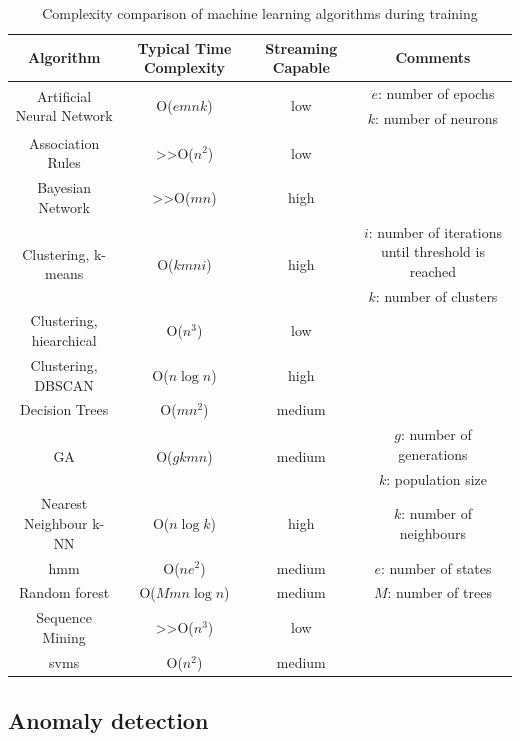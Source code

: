 \begin{table}
    \scriptsize
    \centering
    \begin{tabular}{*{4}{c}}
    \toprule
    \textbf{Algorithm} & \textbf{Typical Time Complexity} & \textbf{Streaming Capable} & \textbf{Comments}\\
    \midrule
    \multirow{2}{*}{Artificial Neural Network} & \multirow{2}{*}{O($emnk$)} & \multirow{2}{*}{low} & $e$: number of epochs\\
    &&& $k$: number of neurons\\
    Association Rules & >>O($n^2$) & low &\\
    Bayesian Network & >>O($mn$) & high &\\
    \multirow{2}{*}{Clustering, k-means} & \multirow{2}{*}{O($kmni$)} & \multirow{2}{*}{high} & $i$: number of iterations until threshold is reached\\
    &&& $k$: number of clusters\\
    Clustering, hiearchical & O($n^3$) & low &\\
    Clustering, DBSCAN & O($n \log n$) & high &\\
    Decision Trees & O($mn^2$) & medium &\\
    \multirow{2}{*}{GA} & \multirow{2}{*}{O($gkmn$)} & \multirow{2}{*}{medium} & $g$: number of generations\\
    &&& $k$: population size\\
    Nearest Neighbour k-NN & O($n \log k$) & high & $k$: number of neighbours\\
    \gls{hmm} & O($ne^2$) & medium & $e$: number of states\\
    Random forest & O($Mmn \log n$) & medium & $M$: number of trees\\
    Sequence Mining & >>O($n^3$) & low &\\
    \glspl{svm} & O($n^2$) & medium &\\
    \bottomrule
    \end{tabular}
    \caption{Complexity comparison of machine learning algorithms during training \citep{Buczak2016}}
    \label{tab:algo_comparison}
\end{table}

\subsection{Anomaly detection}

